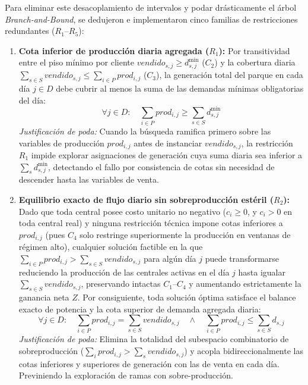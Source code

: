 Para eliminar este desacoplamiento de intervalos y podar drásticamente el árbol \emph{Branch-and-Bound}, se dedujeron e implementaron cinco familias de restricciones redundantes ($R_1$--$R_5$):

\begin{enumerate}
    \item \textbf{Cota inferior de producción diaria agregada ($R_1$):}
    Por transitividad entre el piso mínimo por cliente $vendido_{s,j} \ge d^{\min}_{s,j}$ ($C_2$) y la cobertura diaria $\sum_{s \in S} vendido_{s,j} \le \sum_{i \in P} prod_{i,j}$ ($C_3$), la generación total del parque en cada día $j \in D$ debe cubrir al menos la suma de las demandas mínimas obligatorias del día:
    \begin{equation}
        \forall j \in D: \quad \sum_{i \in P} prod_{i,j} \ge \sum_{s \in S} d^{\min}_{s,j}
        \label{eq:r1_piso_diario}
    \end{equation}
    \emph{Justificación de poda:} Cuando la búsqueda ramifica primero sobre las variables de producción $prod_{i,j}$ antes de instanciar $vendido_{s,j}$, la restricción $R_1$ impide explorar asignaciones de generación cuya suma diaria sea inferior a $\sum_s d^{\min}_{s,j}$, detectando el fallo por consistencia de cotas sin necesidad de descender hasta las variables de venta.

    \item \textbf{Equilibrio exacto de flujo diario sin sobreproducción estéril ($R_2$):}
    Dado que toda central posee costo unitario no negativo ($c_i \ge 0$, y $c_i > 0$ en toda central real) y ninguna restricción técnica impone cotas inferiores a $prod_{i,j}$ (pues $C_4$ solo restringe superiormente la producción en ventanas de régimen alto), cualquier solución factible en la que $\sum_{i \in P} prod_{i,j} > \sum_{s \in S} vendido_{s,j}$ para algún día $j$ puede transformarse reduciendo la producción de las centrales activas en el día $j$ hasta igualar $\sum_{s \in S} vendido_{s,j}$, preservando intactas $C_1$--$C_4$ y aumentando estrictamente la ganancia neta $Z$. Por consiguiente, toda solución óptima satisface el balance exacto de potencia y la cota superior de demanda agregada diaria:
    \begin{equation}
        \forall j \in D: \quad \sum_{i \in P} prod_{i,j} = \sum_{s \in S} vendido_{s,j} \quad \land \quad \sum_{i \in P} prod_{i,j} \le \sum_{s \in S} d_{s,j}
        \label{eq:r2_igualdad_balance}
    \end{equation}
    \emph{Justificación de poda:} Elimina la totalidad del subespacio combinatorio de sobreproducción ($\sum_i prod_{i,j} > \sum_s vendido_{s,j}$) y acopla bidireccionalmente las cotas inferiores y superiores de generación con las de venta en cada día. Previniendo la exploración de ramas con sobre-producción. 


\end{enumerate}
